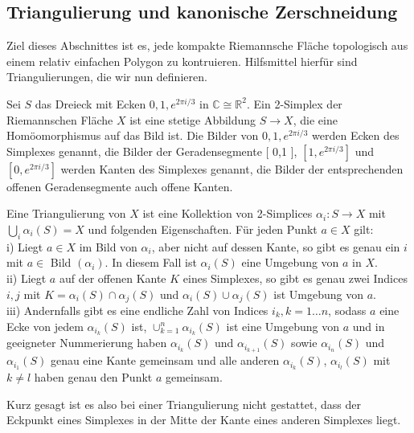 \documentclass[10pt, letterpaper]{article}
\begin{document}
\pagebreak

\subsection {Triangulierung und kanonische Zerschneidung}
Ziel dieses Abschnittes ist es, jede kompakte Riemannsche Fläche topologisch aus einem relativ einfachen Polygon zu kontruieren. Hilfsmittel hierfür sind Triangulierungen, die wir nun definieren.

Sei $S$ das Dreieck mit Ecken $0,1, e^{2 \pi i / 3}$ in $\mathbb{C} \cong \mathbb{R}^{2}$. Ein 2-Simplex der Riemannschen Fläche $X$ ist eine stetige Abbildung $S \rightarrow X$, die eine Homöomorphismus auf das Bild ist. Die Bilder von $0,1, e^{2 \pi i / 3}$ werden Ecken des Simplexes genannt, die Bilder der Geradensegmente [ 0,1 ], $\left[1, e^{2 \pi i / 3}\right]$ und $\left[0, e^{2 \pi i / 3}\right]$ werden Kanten des Simplexes genannt, die Bilder der entsprechenden offenen Geradensegmente auch offene Kanten.

Eine Triangulierung von $X$ ist eine Kollektion von 2-Simplices $\alpha_{i}: S \rightarrow X$ mit $\bigcup_{i} \alpha_{i}(S)=X$ und folgenden Eigenschaften. Für jeden Punkt $a \in X$ gilt:\\
i) Liegt $a \in X$ im Bild von $\alpha_{i}$, aber nicht auf dessen Kante, so gibt es genau ein $i$ mit $a \in$ Bild $\left(\alpha_{i}\right)$. In diesem Fall ist $\alpha_{i}(S)$ eine Umgebung von $a$ in $X$.\\
ii) Liegt $a$ auf der offenen Kante $K$ eines Simplexes, so gibt es genau zwei Indices $i, j$ mit $K=\alpha_{i}(S) \cap \alpha_{j}(S)$ und $\alpha_{i}(S) \cup \alpha_{j}(S)$ ist Umgebung von $a$.\\
iii) Andernfalls gibt es eine endliche Zahl von Indices $i_{k}, k=1 \ldots n$, sodass $a$ eine Ecke von jedem $\alpha_{i_{k}}(S)$ ist, $\cup_{k=1}^{n} \alpha_{i_{k}}(S)$ ist eine Umgebung von $a$ und in geeigneter Nummerierung haben $\alpha_{i_{k}}(S)$ und $\alpha_{i_{k+1}}(S)$ sowie $\alpha_{i_{n}}(S)$ und $\alpha_{i_{1}}(S)$ genau eine Kante gemeinsam und alle anderen $\alpha_{i_{k}}(S)$, $\alpha_{i_{l}}(S)$ mit $k \neq l$ haben genau den Punkt $a$ gemeinsam.

Kurz gesagt ist es also bei einer Triangulierung nicht gestattet, dass der Eckpunkt eines Simplexes in der Mitte der Kante eines anderen Simplexes liegt.
\end{document}
